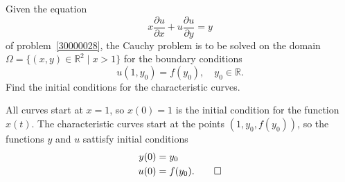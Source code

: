 Given the equation
\[
x
\frac{\partial u}{\partial x}
+
u
\frac{\partial u}{\partial y}
=
y
\]
of problem~\ref{30000028}, the Cauchy problem is to be solved on the
domain $\Omega = \{(x,y)\in\mathbb{R}^2 \mid x>1\}$
for the
boundary conditions
\[
u(1,y_0)
=
f(y_0),\quad y_0\in\mathbb{R}.
\]
Find the initial conditions for the characteristic curves.

\begin{loesung}
All curves start at $x=1$, so $x(0)=1$ is the initial condition for the
function $x(t)$.
The characteristic curves start at the points
$(1,y_0,f(y_0))$, so the functions $y$ and $u$ sattisfy initial
conditions
\begin{align*}
y(0) &= y_0       \\
u(0) &= f(y_0).
\qedhere
\end{align*}
\end{loesung}
